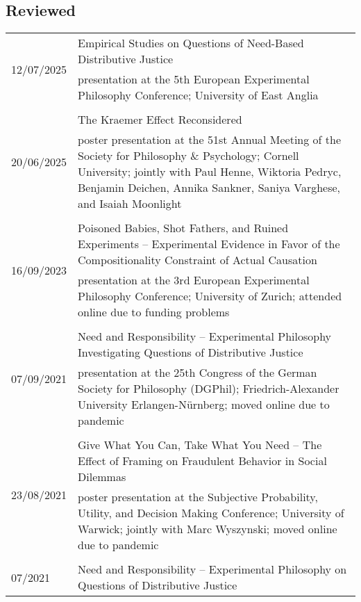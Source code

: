 \documentclass[a4paper,10pt]{article}
\begin{document}
\subsection*{Reviewed}
\begin{longtable}{p{2.5cm}p{11cm}}
\multirow{2}{2.5cm}{\footnotesize{12/07/2025}} & Empirical Studies on Questions of Need-Based Distributive Justice\\
& \footnotesize{presentation at the 5th European Experimental Philosophy Conference; University of East Anglia}\\
\\
\multirow{2}{2.5cm}{\footnotesize{20/06/2025}} & The Kraemer Effect Reconsidered\\
& \footnotesize{poster presentation at the 51st Annual Meeting of the Society for Philosophy \& Psychology; Cornell University; jointly with Paul Henne, Wiktoria Pedryc, Benjamin Deichen, Annika Sankner, Saniya Varghese, and Isaiah Moonlight}\\
\\
\multirow{2}{2.5cm}{\footnotesize{16/09/2023}} & Poisoned Babies, Shot Fathers, and Ruined Experiments -- Experimental Evidence in Favor of the Compositionality Constraint of Actual Causation\\
& \footnotesize{presentation at the 3rd European Experimental Philosophy Conference; University of Zurich; attended online due to funding problems}\\
\\
\multirow{2}{2.5cm}{\footnotesize{07/09/2021}} & Need and Responsibility -- Experimental Philosophy Investigating Questions of Distributive Justice\\
& \footnotesize{presentation at the 25th Congress of the German Society for Philosophy (DGPhil); Friedrich-Alexander University Erlangen-Nürnberg; moved online due to pandemic}\\
\\
\multirow{2}{2.5cm}{\footnotesize{23/08/2021}} & Give What You Can, Take What You Need -- The Effect of Framing on Fraudulent Behavior in Social Dilemmas\\
& \footnotesize{poster presentation at the Subjective Probability, Utility, and Decision Making Conference; University of Warwick; jointly with Marc Wyszynski; moved online due to pandemic}\\
\\
\multirow{2}{2.5cm}{\footnotesize{07/2021}} & Need and Responsibility -- Experimental Philosophy on Questions of Distributive Justice\\

\end{longtable}
\end{document}
